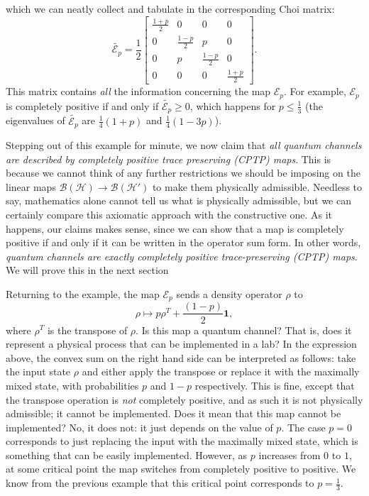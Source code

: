 \documentclass[fleqn]{article}
\begin{document}
which we can neatly collect and tabulate in the corresponding Choi matrix:
\[
  \widetilde{\mathcal{E}_p}
  = \frac12
  \left[
    \begin{array}{cc|cc}
      \frac{1+p}{2} & 0 & 0 & 0
    \\0 & \frac{1-p}{2} & p & 0
    \\\hline
      0 & p & \frac{1-p}{2} & 0
    \\0 & 0 & 0 & \frac{1+p}{2}
    \end{array}
  \right].
\]
This matrix contains \emph{all} the information concerning the map \(\mathcal{E}_p\).
For example, \(\mathcal{E}_p\) is completely positive if and only if \(\widetilde{\mathcal{E}_p}\geqslant 0\), which happens for \(p\leqslant\frac{1}{3}\) (the eigenvalues of \(\widetilde{\mathcal{E}_p}\) are \(\frac{1}{4}(1+p)\) and \(\frac{1}{4}(1-3p)\)).

Stepping out of this example for minute, we now claim that \emph{all quantum channels are described by completely positive trace preserving (CPTP) maps}. This is because we cannot think of any further restrictions we should be imposing on the linear maps \(\mathscr{B}(\mathcal{H})\to\mathscr{B}(\mathcal{H'})\) to make them physically admissible.
Needless to say, mathematics alone cannot tell us what is physically admissible, but we can certainly compare this axiomatic approach with the constructive one.
As it happens, our claims makes sense, since we can show that a map is completely positive if and only if it can be written in the operator sum form.
In other words, \emph{quantum channels are exactly completely positive trace-preserving (CPTP) maps}.
We will prove this in the next section

Returning to the example, the map \(\mathcal{E}_p\) sends a density operator \(\rho\) to
\[
  \rho \longmapsto p\rho^T + \frac{(1-p)}{2}\mathbf{1},
\]
where \(\rho^T\) is the transpose of \(\rho\).
Is this map a quantum channel?
That is, does it represent a physical process that can be implemented in a lab?
In the expression above, the convex sum on the right hand side can be interpreted as follows: take the input state \(\rho\) and either apply the transpose or replace it with the maximally mixed state, with probabilities \(p\) and \(1-p\) respectively.
This is fine, except that the transpose operation is \emph{not} completely positive, and as such it is not physically admissible; it cannot be implemented.
Does it mean that this map cannot be implemented?
No, it does not: it just depends on the value of \(p\).
The case \(p=0\) corresponds to just replacing the input with the maximally mixed state, which is something that can be easily implemented.
However, as \(p\) increases from \(0\) to \(1\), at some critical point the map switches from completely positive to positive. We know from the previous example that this critical point corresponds to \(p=\frac{1}{3}\).
\end{document}
